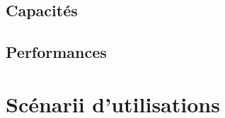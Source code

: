 \documentclass[12pt,a4paper,openany]{article}
\begin{document}
	\subsection{Capacités}
	\subsection{Performances}

	\section{Scénarii d'utilisations}
\end{document}
